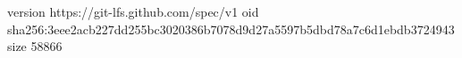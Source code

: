 version https://git-lfs.github.com/spec/v1
oid sha256:3eee2acb227dd255bc3020386b7078d9d27a5597b5dbd78a7c6d1ebdb3724943
size 58866
